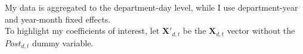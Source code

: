 \documentclass[12pt,a4paper]{article}
\begin{document}
My data is aggregated to the department-day level, while I use department-year and year-month fixed effects. \\

To highlight my coefficients of interest, let $\boldsymbol{X'}_{d,t}$ be the $\boldsymbol{X}_{d,t}$ vector without the $Post_{d,t}$ dummy variable.  



\begin{center}

\end{center}

\begin{center}

\end{center}

\begin{center}

\end{center}



\begin{center}

\end{center}

\begin{center}

\end{center}

\begin{center}

\end{center}
\end{document}
